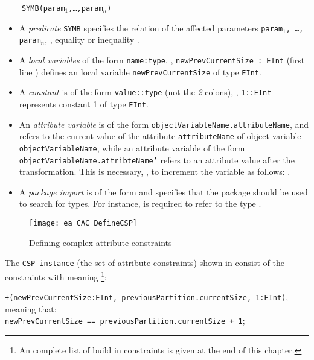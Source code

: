 ~~~~\texttt{SYMB(param$_1$,\ldots,param$_n$)}

\begin{itemize}
\item A \emph{predicate} \texttt{SYMB} specifies the relation of the affected parameters \texttt{param$_1$, \ldots, param$_n$}, \eg, equality \entity{=} or inequality \entity{!=}.
    
\item A \emph{local variables} of the form \texttt{name:type}, \eg, \texttt{newPrevCurrentSize : EInt} (first line ) defines an local variable \texttt{newPrevCurrentSize} of type \texttt{EInt}. 

\item A \emph{constant} is of the form \texttt{value::type} (not the \emph{2} colons), \eg, \texttt{1::EInt} represents constant 1 of type \texttt{EInt}.

\item An \emph{attribute variable} is of the form \texttt{objectVariableName.attributeName}, and refers to the current value of the attribute \texttt{attributeName} of object variable 	\texttt{objectVariableName}, while an attribute variable of the form \texttt{objectVariableName.attribteName'} refers to an attribute value after the transformation.
This is necessary, \eg, to increment the variable  as follows: . 

\item A \emph{package import} is of the form  and specifies that the package  should be used to search for types.
For instance,  is required to refer to the type . 
\end{itemize}


 
\begin{figure}[htbp]
\begin{center}
  \texttt{[image: ea\_CAC\_DefineCSP]}
  \caption{Defining complex attribute constraints}  
  \label{ea:ea_CAC_DefineCSP}
\end{center}
\end{figure}

The \texttt{CSP instance} (the set of attribute constraints) shown in  consist of the constraints with meaning \footnote{An complete list of build in constraints is given at the end of this chapter.}:

\hspace*{0.5cm}\texttt{\small +(newPrevCurrentSize:EInt, previousPartition.currentSize, 1:EInt)},\\
meaning that:\\
\hspace*{0.5cm}\texttt{\small newPrevCurrentSize == previousPartition.currentSize + 1};

